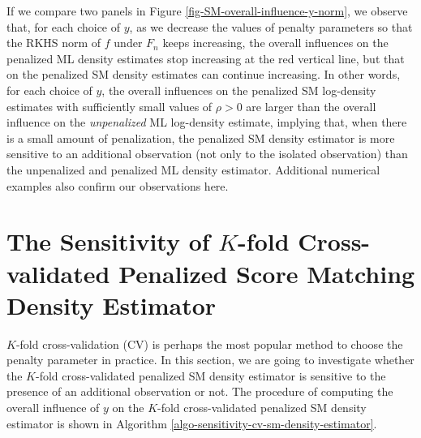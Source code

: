 If we compare two panels in Figure \ref{fig-SM-overall-influence-y-norm}, we observe that, for each choice of $y$, as we decrease the values of penalty parameters so that the RKHS norm of $f$ under $F_n$ keeps increasing, the overall influences on the penalized ML density estimates stop increasing at the red vertical line, but that on the penalized SM density estimates can continue increasing. In other words, for each choice of $y$, the overall influences on the penalized SM log-density estimates with sufficiently small values of $\rho > 0$ are larger than the overall influence on the \emph{unpenalized} ML log-density estimate, implying that, when there is a small amount of penalization, the penalized SM density estimator is more sensitive to an additional observation (not only to the isolated observation) than the unpenalized and penalized ML density estimator. Additional numerical examples also confirm our observations here. 


\section{The Sensitivity of $K$-fold Cross-validated Penalized Score Matching Density Estimator}\label{section-sensitivity-cv-penalized-sm-density-estimator}

$K$-fold cross-validation (CV) is perhaps the most popular method to choose the penalty parameter in practice. In this section, we are going to investigate whether the $K$-fold cross-validated penalized SM density estimator is sensitive to the presence of an additional observation or not. The procedure of computing the overall influence of $y$ on the $K$-fold cross-validated penalized SM density estimator is shown in Algorithm \ref{algo-sensitivity-cv-sm-density-estimator}. 

